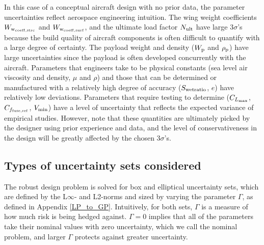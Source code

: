 In this case of a conceptual aircraft design with no prior data,
the parameter uncertainties reflect aerospace engineering intuition.
The wing weight coefficients $W_{\rm{w}_{\rm{coeff,strc}}}$ and $W_{\rm{w}_{\rm{coeff,surf}}}$,
and the ultimate load factor $N_{\rm{ult}}$ have
large $3\sigma$'s because the build quality of aircraft components is
often difficult to quantify with a large degree of certainty.
The payload weight and density ($W_{\rm{p}}$ and $\rho_{\rm{p}}$) have large uncertainties
since the payload is often developed concurrently with the aircraft.
Parameters that engineers take to be
physical constants (sea level air viscosity and density, $\mu$ and $\rho$) and those that can be determined or manufactured with a relatively
high degree of accuracy ($S_{\rm{wetratio}}$, $e$) have relatively low deviations.
Parameters that require testing to determine ($C_{L_{\rm{max}}}$, $C_{f_{\rm{fuse, ref}}}$,
$V_{\rm{min}}$) have a level of uncertainty
that reflects the expected variance of empirical studies. However, note that
these quantities are ultimately picked by the designer using prior experience and data,
and the level of conservativeness in the
design will be greatly affected by the chosen $3\sigma$'s.

\subsection{Types of uncertainty sets considered}

The robust design problem is solved for box and elliptical uncertainty sets,
which are defined by the L$\infty$- and L2-norms and sized
by varying the parameter $\Gamma$, as defined in Appendix \ref{LP_to_GP}.
Intuitively, for both sets, $\Gamma$ is a measure of how much risk is being
hedged against. $\Gamma = 0$
implies that all of the parameters take their nominal values with zero uncertainty,
which we call the nominal problem,
and larger $\Gamma$ protects against greater uncertainty.

